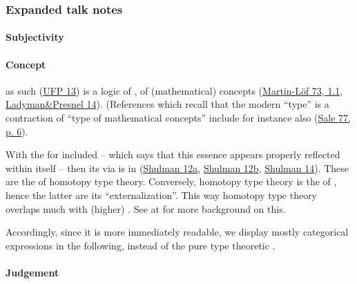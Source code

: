 \documentclass[12pt,titlepage]{article}
\theoremstyle{plain}
\theoremstyle{definition}
\theoremstyle{remark}
\begin{document}
\hypertarget{expanded_talk_notes}{}\subsubsection*{{Expanded talk notes}}\label{expanded_talk_notes}

\hypertarget{FormalizationConcepts}{}\paragraph*{{Subjectivity}}\label{FormalizationConcepts}

\hypertarget{ConceptFormalization}{}\paragraph*{{Concept}}\label{ConceptFormalization}

 as such (\hyperlink{UFP13}{UFP 13}) is a logic of , of (mathematical) concepts (\hyperlink{MartinLoef73}{Martin-Löf 73, 1.1}, \hyperlink{LadymanPresnel14}{Ladyman\&Presnel 14}). (References which recall that the modern ``type'' is a contraction of ``type of mathematical concepts'' include for instance also (\hyperlink{Sale77}{Sale 77, p. 6}).

With the  for   included -- which says that this essence appears properly reflected within itself -- then its  via  is in   (\hyperlink{Shulman12a}{Shulman 12a}, \hyperlink{Shulman12b}{Shulman 12b}, \hyperlink{Shulman14}{Shulman 14}). These are the \emph{} of homotopy type theory. Conversely, homotopy type theory is the  of , hence the latter are its ``externalization''. This way homotopy type theory overlaps much with (higher) \emph{}. See at \emph{} for more background on this.

Accordingly, since it is more immediately readable, we display mostly categorical expressions in the following, instead of the pure type theoretic .

\hypertarget{JudgementInFormalization}{}\paragraph*{{Judgement}}\label{JudgementInFormalization}
\end{document}
